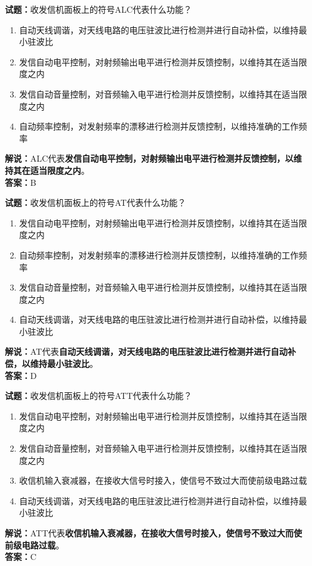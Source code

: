 \documentclass{ctexbook}
\begin{document}
\bigskip


\noindent\textbf{试题：}收发信机面板上的符号ALC代表什么功能？
\begin{enumerate}[leftmargin=3em]
\item 自动天线调谐，对天线电路的电压驻波比进行检测并进行自动补偿，以维持最小驻波比
\item 发信自动电平控制，对射频输出电平进行检测并反馈控制，以维持其在适当限度之内
\item 发信自动音量控制，对音频输入电平进行检测并反馈控制，以维持其在适当限度之内
\item 自动频率控制，对发射频率的漂移进行检测并反馈控制，以维持准确的工作频率
\end{enumerate}
\noindent\textbf{解说：}ALC代表\textbf{发信自动电平控制，对射频输出电平进行检测并反馈控制，以维持其在适当限度之内}。\\\noindent\textbf{答案：}B



\bigskip


\noindent\textbf{试题：}收发信机面板上的符号AT代表什么功能？
\begin{enumerate}[leftmargin=3em]
\item 发信自动电平控制，对射频输出电平进行检测并反馈控制，以维持其在适当限度之内
\item 自动频率控制，对发射频率的漂移进行检测并反馈控制，以维持准确的工作频率
\item 发信自动音量控制，对音频输入电平进行检测并反馈控制，以维持其在适当限度之内
\item 自动天线调谐，对天线电路的电压驻波比进行检测并进行自动补偿，以维持最小驻波比
\end{enumerate}
\noindent\textbf{解说：}AT代表\textbf{自动天线调谐，对天线电路的电压驻波比进行检测并进行自动补偿，以维持最小驻波比}。\\\noindent\textbf{答案：}D




\bigskip


\noindent\textbf{试题：}收发信机面板上的符号ATT代表什么功能？
\begin{enumerate}[leftmargin=3em]
\item 发信自动电平控制，对射频输出电平进行检测并反馈控制，以维持其在适当限度之内
\item 发信自动音量控制，对音频输入电平进行检测并反馈控制，以维持其在适当限度之内
\item 收信机输入衰减器，在接收大信号时接入，使信号不致过大而使前级电路过载
\item 自动天线调谐，对天线电路的电压驻波比进行检测并进行自动补偿，以维持最小驻波比
\end{enumerate}
\noindent\textbf{解说：}ATT代表\textbf{收信机输入衰减器，在接收大信号时接入，使信号不致过大而使前级电路过载}。\\\noindent\textbf{答案：}C
\end{document}
